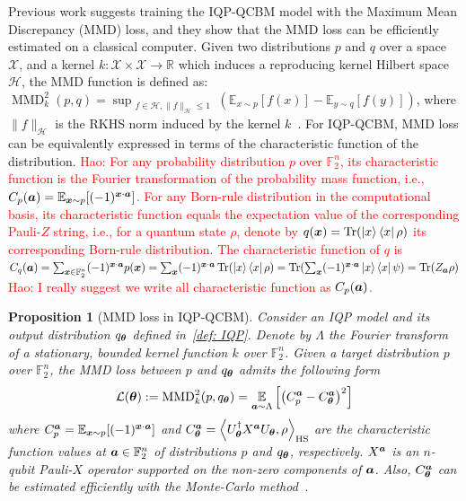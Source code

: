 \documentclass{article}
\theoremstyle{plain}
\newtheorem{proposition}[theorem]{Proposition}
\theoremstyle{definition}
\theoremstyle{remark}
\newcommand{\HS}{\ensuremath{\mathrm{HS}}\xspace}
\newcommand{\hw}[1]{\textcolor{red}{Hao: #1}}
\begin{document}
Previous work \cite{recioarmengol25} suggests training the IQP-QCBM model with the Maximum Mean Discrepancy (MMD) loss, and they show that the MMD loss can be efficiently estimated on a classical computer. Given two distributions $p$ and $q$ over a space $\mathcal{X}$, and a kernel $k: \mathcal{X} \times \mathcal{X} \to \mathbb{R}$ which induces a reproducing kernel Hilbert space $\mathcal{H}$, the MMD function is defined as: $\operatorname{MMD}^2_k(p, q) = \sup_{\substack{f \in \mathcal{H},  \|f\|_{\mathcal{H}} \leq 1}} \left( \mathbb{E}_{x \sim p}[f(x)] - \mathbb{E}_{y \sim q}[f(y)] \right)$, where $\|f\|_{\mathcal{H}}$ is the RKHS norm induced by the kernel $k$~\citep{muandet17}. For IQP-QCBM, MMD loss can be equivalently expressed in terms of the characteristic function of the distribution. \hw{For any probability distribution $p$ over $\mathbb{F}_2^n$, its characteristic function is the Fourier transformation of the probability mass function, i.e., $C_p({\bm{a}}) = \mathbb{E}_{{\bm{x}} \sim p}[(-1)^{{\bm{x}}\cdot {\bm{a}}}]$. For any Born-rule distribution in the computational basis, its characteristic function equals the expectation value of the corresponding Pauli-$Z$ string, i.e., for a quantum state $\rho$, denote by $q({\bm{x}}) =  \Tr(\ket{x}\bra{x}\rho)$ its corresponding Born-rule distribution. The characteristic function of $q$ is $C_q({\bm{a}}) = \sum_{{\bm{x}}\in \mathbb{F}_2^n} (-1)^{{\bm{x}} \cdot {\bm{a}}} p({\bm{x}}) = \sum_{{\bm{x}}} (-1)^{{\bm{x}} \cdot {\bm{a}}} \Tr(\ket{x}\bra{x}\rho) = \Tr(\sum_{{\bm{x}}} (-1)^{{\bm{x}} \cdot {\bm{a}}} \ket{x}\bra{x}\psi) = \Tr(Z_{{\bm{a}}}\rho)$} \\
\hw{I really suggest we write all characteristic function as $C_p({\bm{a}})$.}
\begin{proposition} [MMD loss in IQP-QCBM]
Consider an IQP model and its output distribution $q_{\bm{\theta}}$ defined in~\cref{def: IQP}. Denote by $\Lambda$ the Fourier transform of a stationary, bounded kernel function $k$ over $\mathbb{F}_2^n$. Given a target distribution $p$ over $\mathbb{F}_2^n$, the MMD loss between $p$ and $q_{\bm{\theta}}$ admits the following form~\cite{rudolph24, recioarmengol25}
\begin{equation}
    \mathcal{L}({\bm{\theta}}) := \mathrm{MMD}^2_k(p, q_{\bm{\theta}}) = \operatorname*{\mathbb{E}}_{{\bm{a}} \sim \Lambda} \left[ \left( C^{\bm{a}}_p - C^{\bm{a}}_{\bm{\theta}} \right)^2 \right]
\end{equation}
where $C^{\bm{a}}_p = \operatorname*{\mathbb{E}}_{{\bm{x}} \sim p}[(-1)^{{\bm{x}} \cdot {\bm{a}}}]$ and $C^\vta_\vttheta=\inner{U_\vttheta^\dagger X^{\vta}U_\vttheta}{\rho }_{\HS}$ are the characteristic function values at ${\bm{a}}\in\mathbb{F}_2^n$ of distributions $p$ and $q_{\bm{\theta}}$, respectively.  $X^{\bm{a}}$ is an $n$-qubit Pauli-$X$ operator supported on the non-zero components of ${\bm{a}}$. Also, $C^{\bm{a}}_{\bm{\theta}}$ can be estimated efficiently with the Monte-Carlo method~\cite{recioarmengol25}.  
\end{proposition}
\end{document}
